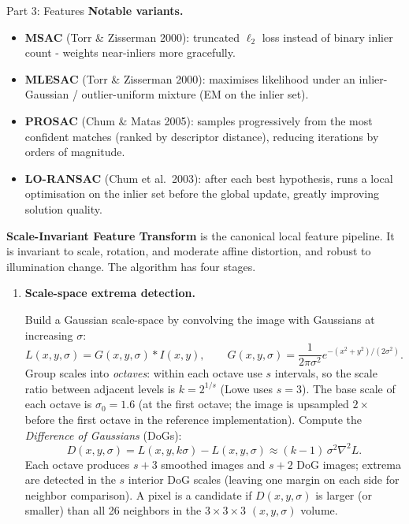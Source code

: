 \documentclass[letterpaper]{article}
\begin{document}
\begin{notes}{Part 3: Features}
\textbf{Notable variants.}
\begin{itemize}
    \item \textbf{MSAC} (Torr \& Zisserman 2000): truncated $\ell_2$ loss instead of binary inlier count - weights near-inliers more gracefully.
    \item \textbf{MLESAC} (Torr \& Zisserman 2000): maximises likelihood under an inlier-Gaussian / outlier-uniform mixture (EM on the inlier set).
    \item \textbf{PROSAC} (Chum \& Matas 2005): samples progressively from the most confident matches (ranked by descriptor distance), reducing iterations by orders of magnitude.
    \item \textbf{LO-RANSAC} (Chum et al.\ 2003): after each best hypothesis, runs a local optimisation on the inlier set before the global update, greatly improving solution quality.
\end{itemize}



\columnbreaknofill



\textbf{Scale-Invariant Feature Transform} is the canonical local feature pipeline. It is invariant to scale, rotation, and moderate affine distortion, and robust to illumination change. The algorithm has four stages.

\begin{enumerate}
    \item \textbf{Scale-space extrema detection.}

    Build a Gaussian scale-space by convolving the image with Gaussians at increasing $\sigma$:
    $$L(x,y,\sigma) = G(x,y,\sigma) * I(x,y), \qquad G(x,y,\sigma) = \frac{1}{2\pi\sigma^2}e^{-(x^2+y^2)/(2\sigma^2)}.$$
    Group scales into \emph{octaves}: within each octave use $s$ intervals, so the scale ratio between adjacent levels is $k = 2^{1/s}$ (Lowe uses $s=3$). The base scale of each octave is $\sigma_0 = 1.6$ (at the first octave; the image is upsampled $2\times$ before the first octave in the reference implementation). Compute the \textit{Difference of Gaussians} (DoGs):
    $$D(x,y,\sigma) = L(x,y,k\sigma) - L(x,y,\sigma) \approx (k-1)\,\sigma^2\nabla^2 L.$$
    Each octave produces $s+3$ smoothed images and $s+2$ DoG images; extrema are detected in the $s$ interior DoG scales (leaving one margin on each side for neighbor comparison). A pixel is a candidate if $D(x,y,\sigma)$ is larger (or smaller) than all 26 neighbors in the $3\times3\times3$ $(x,y,\sigma)$ volume.


\end{enumerate}
\end{notes}
\end{document}
